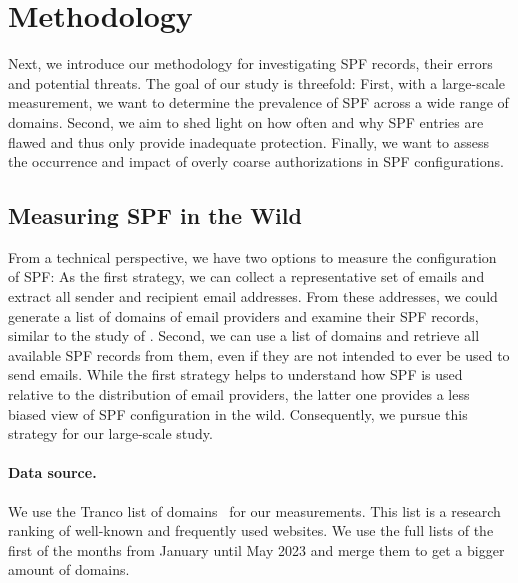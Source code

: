 \section{Methodology}
\label{sec:methodology}

Next, we introduce our methodology for investigating SPF records, their errors and potential threats.
The goal of our study is threefold:
First, with a large-scale measurement, we want to determine the prevalence of SPF across a wide range of domains.
Second, we aim to shed light on how often and why SPF entries are flawed and thus only provide inadequate protection.
Finally, we want to assess the occurrence and impact of overly coarse authorizations in SPF configurations.





\subsection{Measuring SPF in the Wild}
\label{sec:measuring-in-the-wild}

From a technical perspective, we have two options to measure the configuration of \ac{SPF}: 
As the first strategy, we can collect a representative set of emails and extract all sender and recipient email addresses.
From these addresses, we could generate a list of domains of email providers and examine their \ac{SPF} records, similar to the study of \mbox{\citet{Durumeric_2015}}. 
Second, we can use a list of domains and retrieve all available \ac{SPF} records from them, even if they are not intended to ever be used to send emails.
While the first strategy helps to understand how \ac{SPF} is used relative to the distribution of email providers, the latter one provides a less biased view of \ac{SPF} configuration in the wild.
Consequently, we pursue this strategy for our large-scale study.

\paragraph{Data source.}
We use the Tranco list of domains~\citep{TrancoList} for our measurements.
This list is a research ranking of well-known and frequently used websites.
We use the full lists of the first of the months from January until May 2023 and merge them to get a bigger amount of domains.

